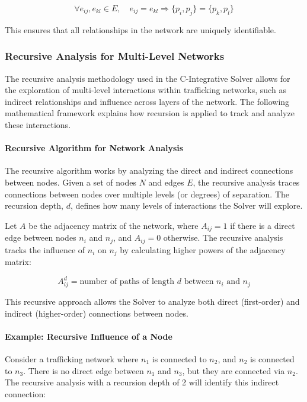 \documentclass[%
 preprint, linenumbers,
 amsmath,amssymb,
 aps, physrev,
]{revtex4-2}
\begin{document}
\[
\forall e_{ij}, e_{kl} \in E, \quad e_{ij} = e_{kl} \Rightarrow \{p_i, p_j\} = \{p_k, p_l\}
\]

This ensures that all relationships in the network are uniquely identifiable.

\subsubsection*{Recursive Analysis for Multi-Level Networks}

The recursive analysis methodology used in the C-Integrative Solver allows for the exploration of multi-level interactions within trafficking networks, such as indirect relationships and influence across layers of the network. The following mathematical framework explains how recursion is applied to track and analyze these interactions.

\paragraph{Recursive Algorithm for Network Analysis}
The recursive algorithm works by analyzing the direct and indirect connections between nodes. Given a set of nodes \( N \) and edges \( E \), the recursive analysis traces connections between nodes over multiple levels (or degrees) of separation. The recursion depth, \( d \), defines how many levels of interactions the Solver will explore.

Let \( A \) be the adjacency matrix of the network, where \( A_{ij} = 1 \) if there is a direct edge between nodes \( n_i \) and \( n_j \), and \( A_{ij} = 0 \) otherwise. The recursive analysis tracks the influence of \( n_i \) on \( n_j \) by calculating higher powers of the adjacency matrix:

\[
A^d_{ij} = \text{number of paths of length } d \text{ between } n_i \text{ and } n_j
\]

This recursive approach allows the Solver to analyze both direct (first-order) and indirect (higher-order) connections between nodes.

\paragraph{Example: Recursive Influence of a Node}
Consider a trafficking network where \( n_1 \) is connected to \( n_2 \), and \( n_2 \) is connected to \( n_3 \). There is no direct edge between \( n_1 \) and \( n_3 \), but they are connected via \( n_2 \). The recursive analysis with a recursion depth of 2 will identify this indirect connection:
\end{document}
